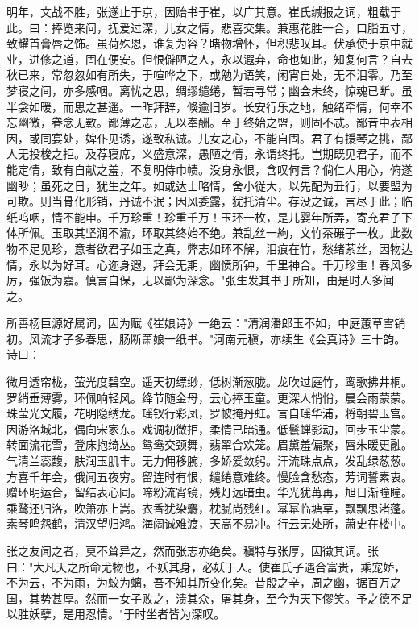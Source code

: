 \documentclass[UTF8,titlepage,oneside]{ctexbook}
\begin{document}
明年，文战不胜，张遂止于京，因贻书于崔，以广其意。崔氏缄报之词，粗载于此。曰：捧览来问，抚爱过深，儿女之情，悲喜交集。兼惠花胜一合，口脂五寸，致耀首膏唇之饰。虽荷殊恩，谁复为容？睹物增怀，但积悲叹耳。伏承使于京中就业，进修之道，固在便安。但恨僻陋之人，永以遐弃，命也如此，知复何言？自去秋已来，常忽忽如有所失，于喧哗之下，或勉为语笑，闲宵自处，无不泪零。乃至梦寝之间，亦多感咽。离忧之思，绸缪缱绻，暂若寻常；幽会未终，惊魂已断。虽半衾如暖，而思之甚遥。一昨拜辞，倏逾旧岁。长安行乐之地，触绪牵情，何幸不忘幽微，眷念无斁。鄙薄之志，无以奉酬。至于终始之盟，则固不忒。鄙昔中表相因，或同宴处，婢仆见诱，遂致私诚。儿女之心，不能自固。君子有援琴之挑，鄙人无投梭之拒。及荐寝席，义盛意深，愚陋之情，永谓终托。岂期既见君子，而不能定情，致有自献之羞，不复明侍巾帻。没身永恨，含叹何言？倘仁人用心，俯遂幽眇；虽死之日，犹生之年。如或达士略情，舍小従大，以先配为丑行，以要盟为可欺。则当骨化形销，丹诚不泯；因风委露，犹托清尘。存没之诚，言尽于此；临纸呜咽，情不能申。千万珍重！珍重千万！玉环一枚，是儿婴年所弄，寄充君子下体所佩。玉取其坚润不渝，环取其终始不绝。兼乱丝一絇，文竹茶碾子一枚。此数物不足见珍，意者欲君子如玉之真，弊志如环不解，泪痕在竹，愁绪萦丝，因物达情，永以为好耳。心迩身遐，拜会无期，幽愤所钟，千里神合。千万珍重！春风多厉，强饭为嘉。慎言自保，无以鄙为深念。"张生发其书于所知，由是时人多闻之。

所善杨巨源好属词，因为赋《崔娘诗》一绝云："清润潘郎玉不如，中庭蕙草雪销初。风流才子多春思，肠断萧娘一纸书。"河南元稹，亦续生《会真诗》三十韵。诗曰：

微月透帘栊，萤光度碧空。遥天初缥缈，低树渐葱胧。龙吹过庭竹，鸾歌拂井桐。罗绡垂薄雾，环佩响轻风。绛节随金母，云心捧玉童。更深人悄悄，晨会雨蒙蒙。珠莹光文履，花明隐绣龙。瑶钗行彩凤，罗帔掩丹虹。言自瑶华浦，将朝碧玉宫。因游洛城北，偶向宋家东。戏调初微拒，柔情已暗通。低鬟蝉影动，回步玉尘蒙。转面流花雪，登床抱绮丛。鸳鸯交颈舞，翡翠合欢笼。眉黛羞偏聚，唇朱暖更融。气清兰蕊馥，肤润玉肌丰。无力佣移腕，多娇爱敛躬。汗流珠点点，发乱绿葱葱。方喜千年会，俄闻五夜穷。留连时有恨，缱绻意难终。慢脸含愁态，芳词誓素衷。赠环明运合，留结表心同。啼粉流宵镜，残灯远暗虫。华光犹苒苒，旭日渐瞳瞳。乘鹜还归洛，吹箫亦上嵩。衣香犹染麝，枕腻尚残红。幂幂临塘草，飘飘思渚蓬。素琴鸣怨鹤，清汉望归鸿。海阔诚难渡，天高不易冲。行云无处所，萧史在楼中。

张之友闻之者，莫不耸异之，然而张志亦绝矣。稹特与张厚，因徵其词。张曰："大凡天之所命尤物也，不妖其身，必妖于人。使崔氏子遇合富贵，乘宠娇，不为云，不为雨，为蛟为螭，吾不知其所变化矣。昔殷之辛，周之幽，据百万之国，其势甚厚。然而一女子败之，溃其众，屠其身，至今为天下僇笑。予之德不足以胜妖孽，是用忍情。"于时坐者皆为深叹。
\end{document}
